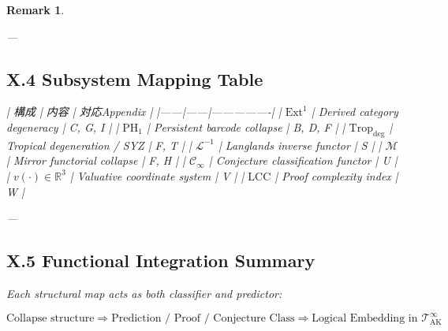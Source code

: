 \documentclass[11pt]{article}
\newtheorem{remark}[theorem]{Remark}
\begin{document}
\begin{remark}
\vspace{1em}
\begin{center}
\end{center}
\vspace{1em}

---

\subsection*{X.4 Subsystem Mapping Table}

| 構成 | 内容 | 対応Appendix |
|------|------|----------------|
| \( \mathrm{Ext}^1 \) | Derived category degeneracy | C, G, I |
| \( \mathrm{PH}_1 \) | Persistent barcode collapse | B, D, F |
| \( \mathrm{Trop}_{\mathrm{deg}} \) | Tropical degeneration / SYZ | F, T |
| \( \mathcal{L}^{-1} \) | Langlands inverse functor | S |
| \( \mathcal{M} \) | Mirror functorial collapse | F, H |
| \( \mathscr{C}_\infty \) | Conjecture classification functor | U |
| \( v(\cdot) \in \mathbb{R}^3 \) | Valuative coordinate system | V |
| \( \mathrm{LCC} \) | Proof complexity index | W |

---

\subsection*{X.5 Functional Integration Summary}

Each structural map acts as both classifier and predictor:

\[
\text{Collapse structure} \Rightarrow \text{Prediction / Proof / Conjecture Class}
\Rightarrow \text{Logical Embedding in } \mathscr{T}_{\mathrm{AK}}^{\infty}
\]


\end{remark}
\end{document}
